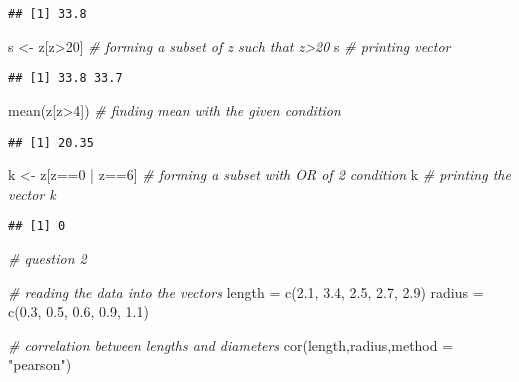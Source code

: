\documentclass[
]{article}
\newenvironment{Shaded}{\begin{snugshade}}{\end{snugshade}}
\newcommand{\AttributeTok}[1]{\textcolor[rgb]{0.77,0.63,0.00}{#1}}
\newcommand{\CommentTok}[1]{\textcolor[rgb]{0.56,0.35,0.01}{\textit{#1}}}
\newcommand{\DecValTok}[1]{\textcolor[rgb]{0.00,0.00,0.81}{#1}}
\newcommand{\FloatTok}[1]{\textcolor[rgb]{0.00,0.00,0.81}{#1}}
\newcommand{\FunctionTok}[1]{\textcolor[rgb]{0.00,0.00,0.00}{#1}}
\newcommand{\NormalTok}[1]{#1}
\newcommand{\OtherTok}[1]{\textcolor[rgb]{0.56,0.35,0.01}{#1}}
\newcommand{\SpecialCharTok}[1]{\textcolor[rgb]{0.00,0.00,0.00}{#1}}
\newcommand{\StringTok}[1]{\textcolor[rgb]{0.31,0.60,0.02}{#1}}
\begin{document}
\begin{verbatim}
## [1] 33.8
\end{verbatim}

\begin{Shaded}
\begin{Highlighting}[]
\NormalTok{s }\OtherTok{\textless{}{-}}\NormalTok{ z[z}\SpecialCharTok{\textgreater{}}\DecValTok{20}\NormalTok{] }\CommentTok{\# forming a subset of z such that z\textgreater{}20}
\NormalTok{s }\CommentTok{\# printing vector}
\end{Highlighting}
\end{Shaded}

\begin{verbatim}
## [1] 33.8 33.7
\end{verbatim}

\begin{Shaded}
\begin{Highlighting}[]
\FunctionTok{mean}\NormalTok{(z[z}\SpecialCharTok{\textgreater{}}\DecValTok{4}\NormalTok{]) }\CommentTok{\# finding mean with the given condition}
\end{Highlighting}
\end{Shaded}

\begin{verbatim}
## [1] 20.35
\end{verbatim}

\begin{Shaded}
\begin{Highlighting}[]
\NormalTok{k }\OtherTok{\textless{}{-}}\NormalTok{ z[z}\SpecialCharTok{==}\DecValTok{0} \SpecialCharTok{|}\NormalTok{ z}\SpecialCharTok{==}\DecValTok{6}\NormalTok{] }\CommentTok{\# forming a subset with \textquotesingle{}OR\textquotesingle{} of 2 condition }
\NormalTok{k }\CommentTok{\# printing the vector k}
\end{Highlighting}
\end{Shaded}

\begin{verbatim}
## [1] 0
\end{verbatim}

\begin{Shaded}
\begin{Highlighting}[]
\CommentTok{\# question 2}

\CommentTok{\# reading the data into the vectors}
\NormalTok{length }\OtherTok{=} \FunctionTok{c}\NormalTok{(}\FloatTok{2.1}\NormalTok{, }\FloatTok{3.4}\NormalTok{, }\FloatTok{2.5}\NormalTok{, }\FloatTok{2.7}\NormalTok{, }\FloatTok{2.9}\NormalTok{)}
\NormalTok{radius }\OtherTok{=} \FunctionTok{c}\NormalTok{(}\FloatTok{0.3}\NormalTok{, }\FloatTok{0.5}\NormalTok{, }\FloatTok{0.6}\NormalTok{, }\FloatTok{0.9}\NormalTok{, }\FloatTok{1.1}\NormalTok{)}

\CommentTok{\# correlation between lengths and diameters}
\FunctionTok{cor}\NormalTok{(length,radius,}\AttributeTok{method =} \StringTok{"pearson"}\NormalTok{)}
\end{Highlighting}
\end{Shaded}
\end{document}

